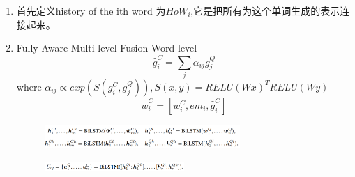 \documentclass[a4paper,UTF8]{article}
\numberwithin{equation}{section}
\begin{document}
\begin{enumerate}
	\item 首先定义history of the ith word 为$HoW_i$,它是把所有为这个单词生成的表示连接起来。
	\item Fully-Aware Multi-level Fusion
		\subitem[1] Word-level\\
		$$\hat{g}_i^C=\sum_j\alpha_{ij}g_j^Q$$
		where $\alpha_{ij} \propto exp(S(g_i^C,g_j^Q)),S(x,y)=RELU(Wx)^TRELU(Wy)$
		$$\tilde{w}_i^C=[w_i^C,em_i,\hat{g}_i^C]$$
		\begin{figure}[H]
			\centering
			\includegraphics[width=0.7\textwidth]{5-2.png}
		\end{figure}
		\begin{figure}[H]
			\centering
			\includegraphics[width=0.5\textwidth]{5-3.png}
		\end{figure}
		

\end{enumerate}
\end{document}
